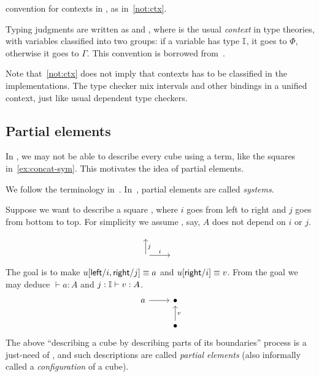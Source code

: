 convention for contexts in \CTT, as in~\cref{not:ctx}.
\begin{notation}\label{not:ctx}
Typing judgments are written as  and ,
where \fbox{$\Phi;\Gamma$} is the usual \textit{context} in type theories,
with variables classified into two groups: if a variable has type $\mathbb{I}$,
it goes to $\Phi$, otherwise it goes to $\Gamma$.
This convention is borrowed from~\cite{ABCFHL}.
\end{notation}
Note that~\cref{not:ctx} does not imply that contexts has to be classified
in the implementations. The \GuestName{} type checker mix intervals
and other bindings in a unified context, just like usual dependent type checkers.

\subsection{Partial elements}\label{sub:partial}
In \CTT, we may not be able to describe every cube using a term,
like the squares in~\cref{ex:concat-sym}.
This motivates the idea of partial elements.
\begin{terminology}
We follow the terminology in~\cite{CubicalAgda}.
In~\cite{CCHM}, partial elements are called \textit{systems}.
\end{terminology}
Suppose we want to describe a square ,
where $i$ goes from left to right and $j$ goes from bottom to top.
For simplicity we assume , say, $A$ does not depend on $i$ or $j$.
\[\begin{tikzcd}
	{} \\
	{} & {}
	\arrow["i", from=2-1, to=2-2]
	\arrow["j"', from=2-1, to=1-1]
\end{tikzcd}\]
The goal is to make $u[\textsf{left}/i, \textsf{right}/j]\equiv a$ and $u[\textsf{right}/i]\equiv v$.
From the goal we may deduce $\vdash a:A$ and $j:\mathbb{I}\vdash v:A$.
\[\begin{tikzcd}
	a & \bullet \\
	& \bullet
	\arrow[from=1-1, to=1-2]
	\arrow["v"', from=2-2, to=1-2]
\end{tikzcd}\]
The above ``describing a cube by describing parts of its boundaries''
process is a just-need of \CTT, and such descriptions are called \textit{partial elements}
(also informally called a \textit{configuration} of a cube).
